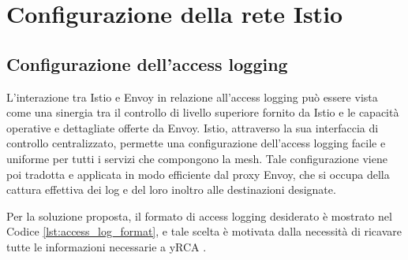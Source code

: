 \section{Configurazione della rete Istio}

\subsection{Configurazione dell'access logging}
L'interazione tra Istio e Envoy in relazione all'access logging può essere vista come una sinergia tra il controllo di livello superiore fornito da Istio e le capacità operative e dettagliate offerte da Envoy. Istio, attraverso la sua interfaccia di controllo centralizzato, permette una configurazione dell'access logging facile e uniforme per tutti i servizi che compongono la mesh. Tale configurazione viene poi tradotta e applicata in modo efficiente dal proxy Envoy, che si occupa della cattura effettiva dei log e del loro inoltro alle destinazioni designate.

Per la soluzione proposta, il formato di access logging desiderato è mostrato nel Codice \ref{lst:access_log_format}, e tale scelta è motivata dalla necessità di ricavare tutte le informazioni necessarie a yRCA \cite{tesi_spiridioni}.

